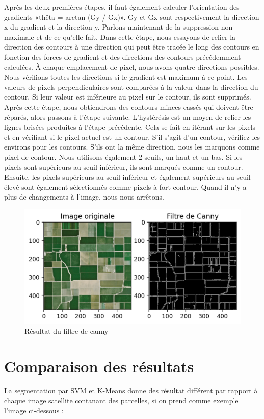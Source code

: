 \documentclass[12pt, openany]{report}
\begin{document}
Après les deux premières étapes, il faut également calculer l'orientation des gradients «thêta = arctan (Gy / Gx)». Gy et Gx sont respectivement la direction x du gradient et la direction y.
Parlons maintenant de la suppression non maximale et de ce qu'elle fait. Dans cette étape, nous essayons de relier la direction des contours à une direction qui peut être tracée le long des contours en fonction des forces de gradient et des directions des contours précédemment calculées. À chaque emplacement de pixel, nous avons quatre directions possibles. Nous vérifions toutes les directions si le gradient est maximum à ce point. Les valeurs de pixels perpendiculaires sont comparées à la valeur dans la direction du contour. Si leur valeur est inférieure au pixel sur le contour, ils sont supprimés. Après cette étape, nous obtiendrons des contours minces cassés qui doivent être réparés, alors passons à l'étape suivante.
L'hystérésis est un moyen de relier les lignes brisées produites à l'étape précédente. Cela se fait en itérant sur les pixels et en vérifiant si le pixel actuel est un contour. S'il s'agit d'un contour, vérifiez les environs pour les contours. S'ils ont la même direction, nous les marquons comme pixel de contour. Nous utilisons également 2 seuils, un haut et un bas. Si les pixels sont supérieurs au seuil inférieur, ils sont marqués comme un contour. Ensuite, les pixels supérieurs au seuil inférieur et également supérieurs au seuil élevé sont également sélectionnés comme pixels à fort contour. Quand il n'y a plus de changements à l'image, nous nous arrêtons.

\begin{figure}[H]
\centering
\includegraphics[scale=1.2]{canny_filter.png}
\caption{Résultat du filtre de canny}
\end{figure}

\section{Comparaison des résultats}
La segmentation par SVM et K-Means donne des résultat différent par rapport à chaque image satellite contanant des parcelles, si on prend comme exemple l'image ci-dessous : 
\end{document}

